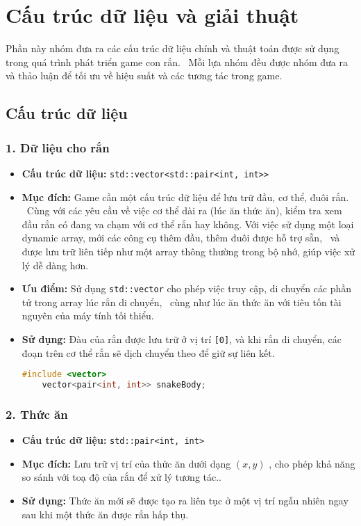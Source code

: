 \documentclass[12pt]{report}
\begin{document}
\section*{Cấu trúc dữ liệu và giải thuật}
Phần này nhóm đưa ra các cấu trúc dữ liệu chính và thuật toán được sử dụng trong quá trình phát triển game con rắn. \
Mỗi lựa nhóm đều được nhóm đưa ra và thảo luận để tối ưu về hiệu suất và các tương tác trong game.

\subsection*{Cấu trúc dữ liệu}
\subsubsection*{1. Dữ liệu cho rắn}
\begin{itemize}
    \item \textbf{Cấu trúc dữ liệu:} \texttt{std::vector<std::pair<int, int>>}
    \item \textbf{Mục đích:} Game cần một cấu trúc dữ liệu để lưu trữ đầu, cơ thể, đuôi rắn. \
          Cùng với các yêu cầu về việc cơ thể dài ra (lúc ăn thức ăn), kiểm tra xem đầu rắn có đang va chạm với cơ thể rắn hay không.
          Với việc sử dụng một loại dynamic array, mới các công cụ thêm đầu, thêm đuôi được hỗ trợ sẵn, \
          và được lưu trữ liên tiếp như một array thông thường trong bộ nhớ, giúp việc xử lý dễ dàng hơn.
    \item \textbf{Ưu điểm:} Sử dụng \texttt{std::vector} cho phép việc truy cập, di chuyển các phần tử trong array lúc rắn di chuyển, \
          cùng như lúc ăn thức ăn với tiêu tốn tài nguyên của máy tính tối thiểu.
    \item \textbf{Sử dụng:} Đàu của rắn được lưu trữ ở vị trí \texttt{[0]}, và khi rắn di chuyển, các đoạn trên cơ thể rắn sẽ dịch chuyển theo để giữ sự liên kết.
          \begin{footnotesize}
              \begin{lstlisting}[language=C++]
    #include <vector>
    vector<pair<int, int>> snakeBody;
    \end{lstlisting}
          \end{footnotesize}
\end{itemize}

\subsubsection*{2. Thức ăn}
\begin{itemize}
    \item \textbf{Cấu trúc dữ liệu:} \texttt{std::pair<int, int>}
    \item \textbf{Mục đích:} Lưu trữ vị trí của thức ăn dưới dạng $(x, y)$ , cho phép khả năng so sánh với toạ độ của rắn để xử lý tương tác..
    \item \textbf{Sử dụng:} Thức ăn mới sẽ được tạo ra liên tục ở một vị trí ngẫu nhiên ngay sau khi một thức ăn được rắn hấp thụ.
\end{itemize}
\end{document}
